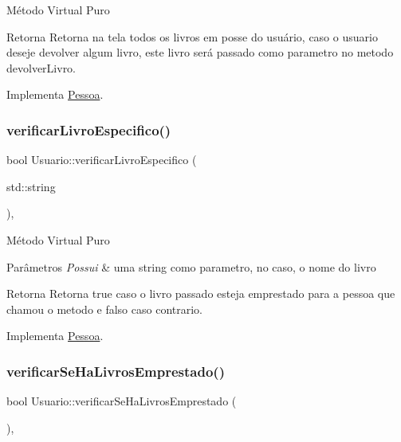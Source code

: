 Método Virtual Puro \begin{DoxyReturn}{Retorna}
Retorna na tela todos os livros em posse do usuário, caso o usuario deseje devolver algum livro, este livro será passado como parametro no metodo devolver\+Livro. 
\end{DoxyReturn}


Implementa \mbox{\hyperlink{class_pessoa_acf173c004fed24a7ab087951b3e35814}{Pessoa}}.

\mbox{\label{class_usuario_a4924ca45ad5dfc728a1b42b5d796f276}} 
\subsubsection{\texorpdfstring{verificarLivroEspecifico()}{verificarLivroEspecifico()}}
{\footnotesize\ttfamily bool Usuario\+::verificar\+Livro\+Especifico (\begin{DoxyParamCaption}\item[{std\+::string}]{ }\end{DoxyParamCaption})\hspace{0.3cm}{\ttfamily [override]}, {\ttfamily [virtual]}}

Método Virtual Puro 
\begin{DoxyParams}{Parâmetros}
{\em Possui} & uma string como parametro, no caso, o nome do livro \\
\hline
\end{DoxyParams}
\begin{DoxyReturn}{Retorna}
Retorna true caso o livro passado esteja emprestado para a pessoa que chamou o metodo e falso caso contrario. 
\end{DoxyReturn}


Implementa \mbox{\hyperlink{class_pessoa_ad405167e003a8b8960176b45ae70803c}{Pessoa}}.

\mbox{\label{class_usuario_a31278ae35c22cfd776023ac61fd7b936}} 
\subsubsection{\texorpdfstring{verificarSeHaLivrosEmprestado()}{verificarSeHaLivrosEmprestado()}}
{\footnotesize\ttfamily bool Usuario\+::verificar\+Se\+Ha\+Livros\+Emprestado (\begin{DoxyParamCaption}{ }\end{DoxyParamCaption})\hspace{0.3cm}{\ttfamily [override]}, {\ttfamily [virtual]}}

